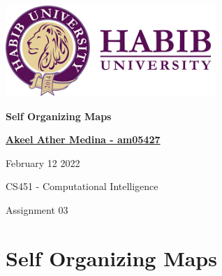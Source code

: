 \documentclass[12pt]{report} %
\begin{document}
% 

 \begin{titlepage}
\vspace*{\fill}

    \begin{center}
        \includegraphics[width=0.6\textwidth]{images/logo.png}
        
        \huge
        \textbf{Self Organizing Maps}
        \vspace{0.5cm}
 
        \Large
        
        \textbf{ \href{mailto:am05427@st.habib.edu.pk}{{Akeel Ather Medina - am05427}}}
        
        February 12 2022
        \vspace{0.5cm}
        
        CS451 - Computational Intelligence 
        
        \vspace{0.5cm}
        \large
        Assignment 03\\
    
    \end{center}
    
    \vspace*{\fill}
\end{titlepage}

% 

\setcounter{page}{2} %



\chapter{Self Organizing Maps}
\end{document}
